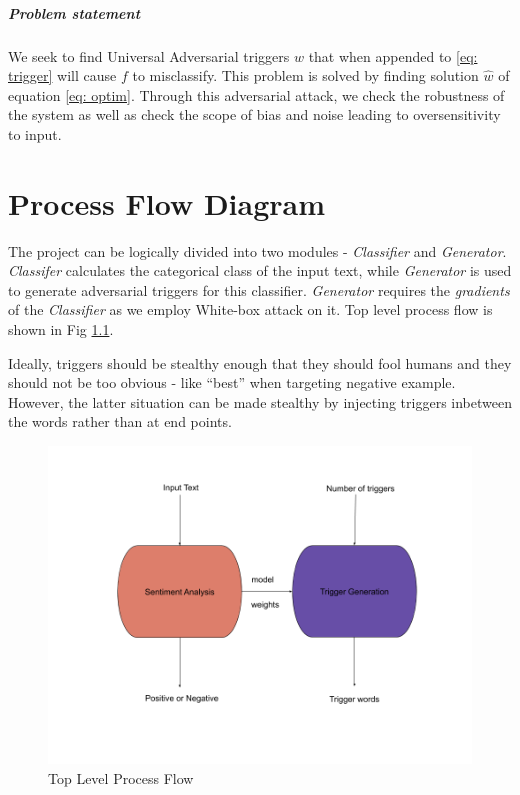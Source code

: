 \documentclass[12pt]{report}
\begin{document}
\begin{spacing}{1.5}
\paragraph{Problem statement}
We seek to find Universal Adversarial triggers $w$ that when appended to \ref{eq: trigger} will cause $f$ to misclassify. This problem is solved by finding solution $\hat{w}$ of equation \ref{eq: optim}. Through this adversarial attack, we check the robustness of the system as well as check the scope of bias and noise leading to oversensitivity to input.


\chapter{Process Flow Diagram}
 The project can be logically divided into two modules - \textit{Classifier} and \textit{Generator}. \textit{Classifer} calculates the categorical class of the input text, while \textit{Generator} is used to generate adversarial triggers for this classifier. \textit{Generator} requires the \textit{gradients} of the \textit{Classifier} as we employ White-box attack on it. Top level process flow is shown in Fig \ref{img: top_level}.

Ideally, triggers should be stealthy enough that they should fool humans and they should not be too obvious - like ``best'' when targeting negative example.
However, the latter situation can be made stealthy by injecting triggers inbetween the words rather than at end points.

\begin{figure}[!h]
  \centering
  \includegraphics[width=0.8\linewidth]{./img/top_level.png}
  \caption{Top Level Process Flow}
  \label{img: top_level}
\end{figure}



\end{spacing}
\end{document}
